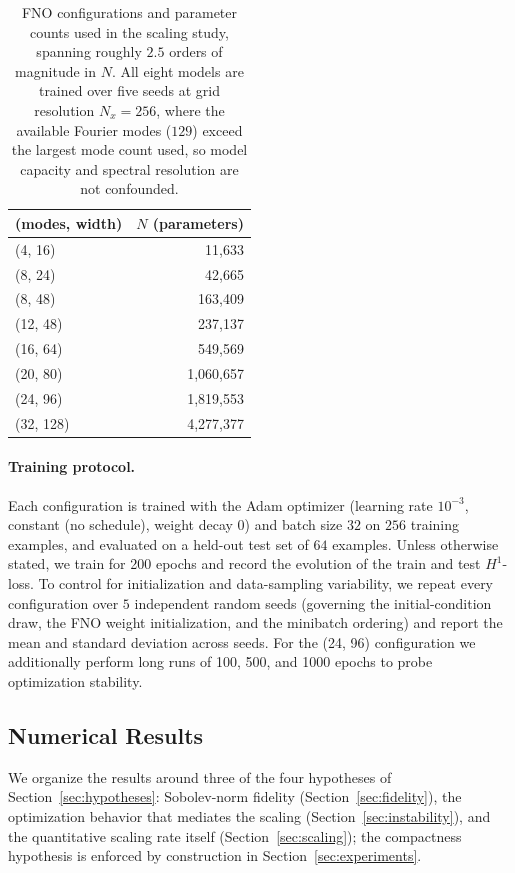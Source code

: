 \documentclass[11pt]{article}
\newcommand{\gridres}{256}
\newcommand{\lr}{10^{-3}}
\newcommand{\lrschedule}{constant (no schedule)}
\newcommand{\wdecay}{0}
\newcommand{\batchsize}{32}
\newcommand{\ntrain}{256}
\newcommand{\ntest}{64}
\newcommand{\nseeds}{5}
\newcommand{\sweepdecades}{2.5}
\theoremstyle{plain}
\theoremstyle{definition}
\theoremstyle{remark}
\begin{document}
\begin{table}[ht]
    \centering
    \begin{tabular}{lr}
    \toprule
    (modes, width) & $N$ (parameters) \\
    \midrule
    (4, 16)   & 11{,}633 \\
    (8, 24)   & 42{,}665 \\
    (8, 48)   & 163{,}409 \\
    (12, 48)  & 237{,}137 \\
    (16, 64)  & 549{,}569 \\
    (20, 80)  & 1{,}060{,}657 \\
    (24, 96)  & 1{,}819{,}553 \\
    (32, 128) & 4{,}277{,}377 \\
    \bottomrule
    \end{tabular}
    \caption{FNO configurations and parameter counts used in the scaling study,
    spanning roughly $\sweepdecades$ orders of magnitude in $N$. All eight
    models are trained over five seeds at grid resolution $N_x = \gridres$,
    where the available Fourier modes ($129$) exceed the largest mode count
    used, so model capacity and spectral resolution are not confounded.}
    \label{tab:configs}
\end{table}

\paragraph{Training protocol.}
Each configuration is trained with the Adam optimizer (learning rate $\lr$,
\lrschedule, weight decay $\wdecay$) and batch size $\batchsize$ on $\ntrain$
training examples, and evaluated on a held-out test set of $\ntest$ examples.
Unless otherwise stated, we train for 200 epochs and record the evolution of
the train and test $H^1$-loss. To control for initialization and data-sampling
variability, we repeat every configuration over $\nseeds$ independent random
seeds (governing the initial-condition draw, the FNO weight initialization, and
the minibatch ordering) and report the mean and standard deviation across
seeds. For the (24, 96) configuration we additionally perform long runs of
100, 500, and 1000 epochs to probe optimization stability.

\subsection{Numerical Results}
We organize the results around three of the four hypotheses of
Section~\ref{sec:hypotheses}: Sobolev-norm fidelity
(Section~\ref{sec:fidelity}), the optimization behavior that mediates the
scaling (Section~\ref{sec:instability}), and the quantitative scaling rate
itself (Section~\ref{sec:scaling}); the compactness hypothesis is enforced by
construction in Section~\ref{sec:experiments}.
\end{document}
